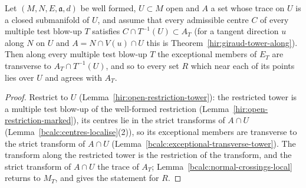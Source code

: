 \begin{lemma}
\label{bcalc:exceptional-transverse-open}
\mixedleanok
Let \((M,N,E,\mathfrak a,d)\) be well formed, \(U\subset M\) open and \(A\) a set whose trace on \(U\) is a closed submanifold of \(U\), and assume that every
admissible centre \(C\) of every multiple test blow-up \(T\) satisfies \(C\cap T^{-1}(U)\subset A_T\) (for a tangent direction \(u\) along \(N\) on \(U\) and
\(A=N\cap V(u)\cap U\) this is Theorem~\ref{hir:giraud-tower-along}). Then along every multiple test blow-up \(T\) the exceptional members of \(E_T\) are transverse
to \(A_T\cap T^{-1}(U)\), and so to every set \(R\) which near each of its points lies over \(U\) and agrees with \(A_T\).
\end{lemma}
\begin{proof}
\mixedleanok
Restrict to \(U\) (Lemma~\ref{hir:open-restriction-tower}): the restricted tower is a multiple test blow-up of the well-formed restriction
(Lemma~\ref{hir:open-restriction-marked}), its centres lie in the strict transforms of \(A\cap U\) (Lemma~\ref{bcalc:centres-localise}(2)), so its exceptional
members are transverse to the strict transform of \(A\cap U\) (Lemma~\ref{bcalc:exceptional-transverse-tower}). The transform along the restricted tower is the
restriction of the transform, and the strict transform of \(A\cap U\) the trace of \(A_T\); Lemma~\ref{bcalc:normal-crossings-local} returns to \(M_T\), and gives the
statement for \(R\).
\end{proof}

